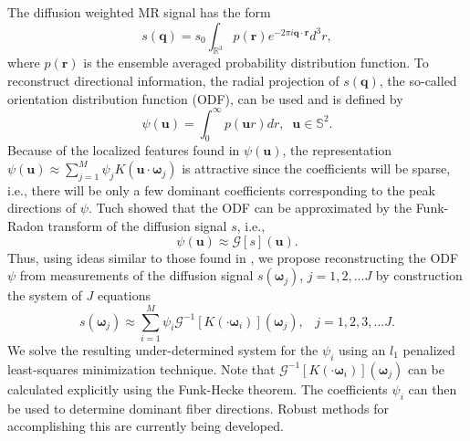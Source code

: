 \documentclass[landscape,a0b,final]{a0poster}
\newcommand{\bomega}{{\boldsymbol{\omega}}}
\newenvironment{poster}{
  \begin{center}
  \begin{minipage}[c]{0.98\textwidth}
}{
  \end{minipage} 
  \end{center}
}
\newcommand{\pbox}[4]{
\psshadowbox[#3]{
\begin{minipage}[t][#2][t]{#1}
#4
\end{minipage}
}}
\begin{document}
\begin{poster}
\begin{multicols}{3}
%
\vspace{0.25cm}
\begin{center}\pbox{0.8\columnwidth}{}{linewidth=2mm,framearc=0.1,linecolor=lightblue,fillstyle=gradient,gradangle=0,gradbegin=white,gradend=whiteblue,gradmidpoint=1.0,framesep=1em}{\begin{center}HARDI Reconstruction\end{center}}\end{center}
\vspace{0.25cm}
The diffusion weighted MR signal has the form
%
\begin{equation}
  s\left(\mathbf{q}\right) = s_0\int_{\mathbb{R}^3}p\left(\mathbf{r}\right)e^{-2\pi i \mathbf{q}\cdot\mathbf{r}}d^3r,
\end{equation}
%
where $p\left(\mathbf{r}\right)$ is the ensemble averaged probability distribution function. To reconstruct directional information, the radial projection of $s\left(\mathbf{q}\right)$, the so-called orientation distribution function (ODF), can be used and is defined by
%
\begin{equation}
  \psi\left(\mathbf{u}\right) = \int_0^{\infty} p\left(\mathbf{u}r\right) dr,\;\; \mathbf{u}\in\mathbb{S}^2.
\end{equation}
Because of the localized features found in $\psi\left(\mathbf{u}\right)$, the representation $\psi\left(\mathbf{u}\right) \approx \sum_{j=1}^M \psi_j K\left(\mathbf{u}\cdot\bomega_{j}\right)$ is attractive since the coefficients will be sparse, i.e., there will be only a few dominant coefficients corresponding to the peak directions of $\psi$. Tuch \cite{TUCH-2004} showed that the ODF can be approximated by the Funk-Radon transform of the diffusion signal $s$, i.e.,
%
\begin{equation}
  \psi\left(\mathbf{u}\right) \approx \mathcal{G}\left[s\right]\left(\mathbf{u}\right).
\end{equation}
%
Thus, using ideas similar to those found in \cite{L-C-D-H-2009}, we propose reconstructing the ODF $\psi$ from measurements of the diffusion signal $s\left(\bomega_{j}\right)$, $j=1,2,...J$ by construction the system of $J$ equations
%
\begin{equation}
  s\left(\bomega_{j}\right) \approx \sum_{i=1}^M \psi_i \mathcal{G}^{-1}\left[K\left(\cdot\bomega_{i}\right)\right]\left(\bomega_{j}\right), \;\;\;j=1,2,3,...J.
\end{equation}
%
We solve the resulting under-determined system for the $\psi_i$ using an $l_1$ penalized least-squares minimization technique. Note that $\mathcal{G}^{-1}\left[K\left(\cdot\bomega_{i}\right)\right]\left(\bomega_{j}\right)$ can be calculated explicitly using the Funk-Hecke theorem. The coefficients $\psi_i$ can then be used to determine dominant fiber directions. Robust methods for accomplishing this are currently being developed.

\end{multicols}
\end{poster}
\end{document}
